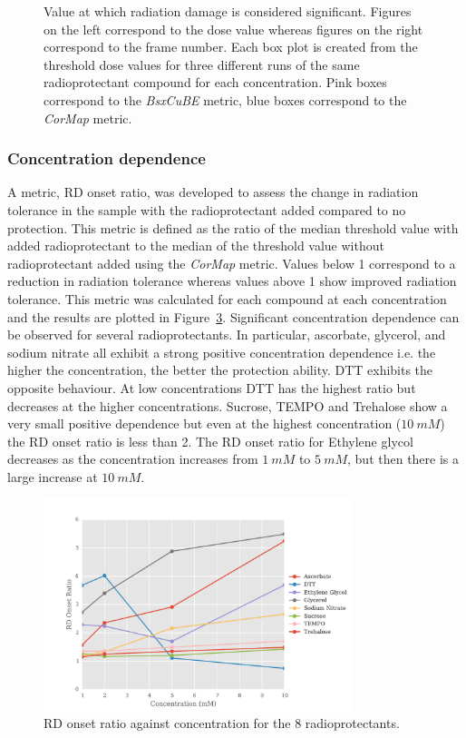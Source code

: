 \begin{figure}
\begin{subfigure}[b]{0.45\textwidth}
            \caption{}
            \label{fig:SAXS frame- 10mM}
    \end{subfigure}
    \caption{Value at which radiation damage is considered significant. Figures on the left correspond to the dose value whereas figures on the right correspond to the frame number. Each box plot is created from the threshold dose values for three different runs of the same radioprotectant compound for each concentration. Pink boxes correspond to the \textit{BsxCuBE} metric, blue boxes correspond to the \textit{CorMap} metric.}
    \label{fig:SAXS dose vs frame}
\end{figure}

\subsubsection{Concentration dependence}
\label{subs:Concentration dependence}
A metric, RD onset ratio, was developed to assess the change in radiation tolerance in the sample with the radioprotectant added compared to no protection.
This metric is defined as the ratio of the median threshold value with added radioprotectant to the median of the threshold value without radioprotectant added using the \textit{CorMap} metric.
Values below 1 correspond to a reduction in radiation tolerance whereas values above 1 show improved radiation tolerance.
This metric was calculated for each compound at each concentration and the results are plotted in Figure~\ref{fig:SAXS Ratio plot}.
Significant concentration dependence can be observed for several radioprotectants.
In particular, ascorbate, glycerol, and sodium nitrate all exhibit a strong positive concentration dependence i.e. the higher the concentration, the better the protection ability.
DTT exhibits the opposite behaviour.
At low concentrations DTT has the highest ratio but decreases at the higher concentrations.
Sucrose, TEMPO and Trehalose show a very small positive dependence but even at the highest concentration ($10\ mM$) the RD onset ratio is less than 2.
The RD onset ratio for Ethylene glycol decreases as the concentration increases from $1\ mM$ to $5\ mM$, but then there is a large increase at $10\ mM$.
\begin{figure}
    \centering
    \includegraphics[width=0.8\textwidth]{figures/saxs/RatioPlots.pdf}
    \caption{RD onset ratio against concentration for the 8 radioprotectants.}
    \label{fig:SAXS Ratio plot}
\end{figure}

